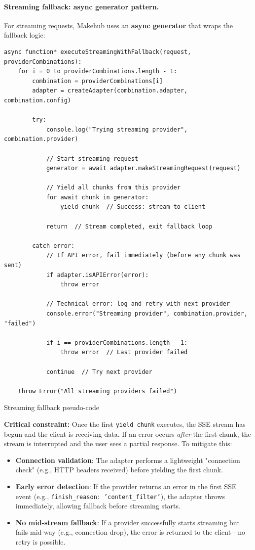 \documentclass[english]{article}
\begin{document}
\paragraph{Streaming fallback: async generator pattern.}

For streaming requests, Makehub uses an \textbf{async generator} that wraps the fallback logic:

\begin{listing}[H]
\begin{verbatim}
async function* executeStreamingWithFallback(request, providerCombinations):
    for i = 0 to providerCombinations.length - 1:
        combination = providerCombinations[i]
        adapter = createAdapter(combination.adapter, combination.config)

        try:
            console.log("Trying streaming provider", combination.provider)

            // Start streaming request
            generator = await adapter.makeStreamingRequest(request)

            // Yield all chunks from this provider
            for await chunk in generator:
                yield chunk  // Success: stream to client

            return  // Stream completed, exit fallback loop

        catch error:
            // If API error, fail immediately (before any chunk was sent)
            if adapter.isAPIError(error):
                throw error

            // Technical error: log and retry with next provider
            console.error("Streaming provider", combination.provider, "failed")

            if i == providerCombinations.length - 1:
                throw error  // Last provider failed

            continue  // Try next provider

    throw Error("All streaming providers failed")
\end{verbatim}
\caption{Streaming fallback pseudo-code}
\end{listing}

\textbf{Critical constraint:} Once the first \texttt{yield chunk} executes, the SSE stream has begun and the client is receiving data. If an error occurs \emph{after} the first chunk, the stream is interrupted and the user sees a partial response. To mitigate this:

\begin{itemize}
    \item \textbf{Connection validation}: The adapter performs a lightweight "connection check" (e.g., HTTP headers received) before yielding the first chunk.
    \item \textbf{Early error detection}: If the provider returns an error in the first SSE event (e.g., \texttt{finish\_reason: 'content\_filter'}), the adapter throws immediately, allowing fallback before streaming starts.
    \item \textbf{No mid-stream fallback}: If a provider successfully starts streaming but fails mid-way (e.g., connection drop), the error is returned to the client—no retry is possible.
\end{itemize}
\end{document}
